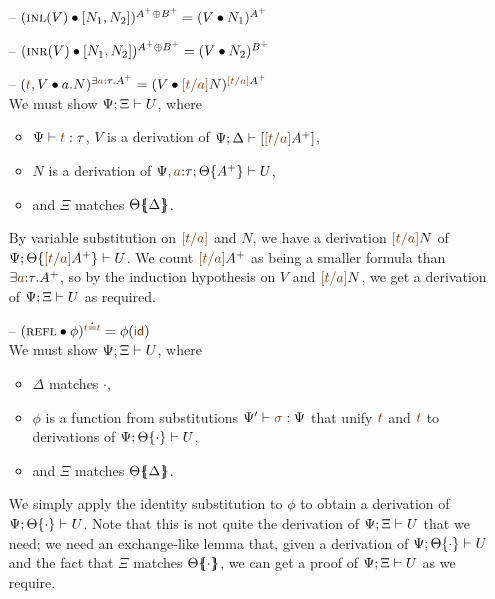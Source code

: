 \begin{itemize}
\item[--] $({\textsc{inl}({V})} \bullet {[{N_1},{N_2}]})^{A^+ \oplus B^+} 
           = ({V} \bullet {N_1})^{A^+}$

\item[--] $({\textsc{inr}({V})} \bullet {[{N_1},{N_2}]})^{A^+ \oplus B^+} 
           = ({V} \bullet {N_2})^{B^+}$

\item[--] $(\subst{\texistsr{\lf{t}}{V}}{\texistsl{a}{N}})^{\exists \lf{a}{:}\tau.A^+}
           = (\subst{V}{\lf{[t/a]}N})^{\lf{[t/a]}A^+}$ \smallskip\\
  We must show ${\Psi};{\Xi} \vdash {U} \mathstrut$, where
  \begin{itemize}
  \item $\Psi \vdash \lf{t} : \tau$, $V$ is a derivation of 
     $\foc{\Psi}{\Delta}{[\lf{[t/a]}A^+]}$,
  \item 
     $N$ is a derivation of 
     $\foc{\Psi, \lf{a}{:}\tau}{\tackon{\Theta}{A^+}}{U}$,
  \item and $\Xi$ matches ${\Theta}\mbox{$\{\hspace{-4pt}\{$}{\Delta}\mbox{$\}\hspace{-4pt}\}$}$.
  \end{itemize}
  By variable
  substitution on $\lf{[t/a]}$ and $N$, we have a derivation $\lf{[t/a]}N$ of
  $\foc{\Psi}{\tackon{\Theta}{\lf{[t/a]}A^+}}{U}$.  We count $\lf{[t/a]}A^+$ as
  being a smaller formula than $\exists \lf{a}{:}\tau.A^+$, so by the
  induction hypothesis on $V$ and $\lf{[t/a]}N$, we get a derivation of
  ${\Psi};{\Xi} \vdash {U} \mathstrut$ as required. \smallskip

\item[--] $(\subst{\tunifr}{\phi})^{\lf t \doteq \lf t} = \phi(\lf{\sf id})$\smallskip\\
  We must show ${\Psi};{\Xi} \vdash {U} \mathstrut$, where
  \begin{itemize}
  \item $\Delta$ matches $\cdot$,
  \item $\phi$ is a function from substitutions $\Psi' \vdash \lf\sigma : \Psi$
     that unify $\lf t$ and $\lf t$ to derivations of 
     ${\Psi};{{\Theta}\{{\cdot}\}} \vdash {U} \mathstrut$,
  \item and $\Xi$ matches ${\Theta}\mbox{$\{\hspace{-4pt}\{$}{\Delta}\mbox{$\}\hspace{-4pt}\}$}$.
  \end{itemize}
  We simply apply the identity substitution to $\phi$
  to obtain a derivation of ${\Psi};{{\Theta}\{{\cdot}\}} \vdash {U} \mathstrut$.
  Note that this is not quite the derivation of 
  ${\Psi};{\Xi} \vdash {U} \mathstrut$ that we need; we need an exchange-like lemma that, 
  given a derivation of ${\Psi};{{\Theta}\{{\cdot}\}} \vdash {U} \mathstrut$
  and the fact that $\Xi$ matches ${\Theta}\mbox{$\{\hspace{-4pt}\{$}{\cdot}\mbox{$\}\hspace{-4pt}\}$}$,
  we can get a proof of ${\Psi};{\Xi} \vdash {U} \mathstrut$ as we require.

\end{itemize}

